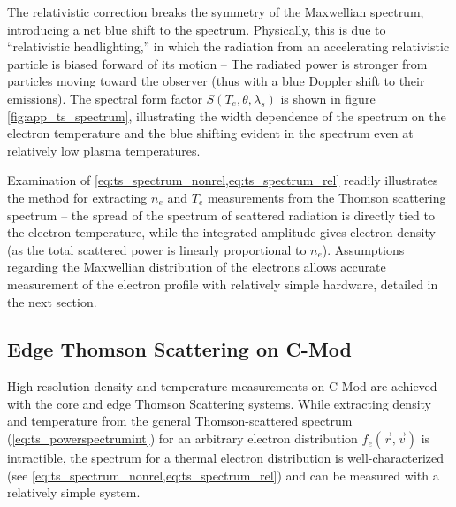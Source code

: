 \noindent The relativistic correction breaks the symmetry of the Maxwellian spectrum, introducing a net blue shift to the spectrum.  Physically, this is due to ``relativistic headlighting,'' in which the radiation from an accelerating relativistic particle is biased forward of its motion -- The radiated power is stronger from particles moving toward the observer (thus with a blue Doppler shift to their emissions).  The spectral form factor $S(T_e,\theta,\lambda_s)$ is shown in figure \cref{fig:app_ts_spectrum}, illustrating the width dependence of the spectrum on the electron temperature and the blue shifting evident in the spectrum even at relatively low plasma temperatures.

Examination of \cref{eq:ts_spectrum_nonrel,eq:ts_spectrum_rel} readily illustrates the method for extracting $n_e$ and $T_e$ measurements from the Thomson scattering spectrum -- the spread of the spectrum of scattered radiation is directly tied to the electron temperature, while the integrated amplitude gives electron density (as the total scattered power is linearly proportional to $n_e$).  Assumptions regarding the Maxwellian distribution of the electrons allows accurate measurement of the electron profile with relatively simple hardware, detailed in the next section.

\subsection{Edge Thomson Scattering on C-Mod}\label{subsec:app_ts_cmod}

High-resolution density and temperature measurements on C-Mod are achieved with the core \cite{Watterson1990,Mossessian1999} and edge \cite{Hughes2001,Hughes2003,Hughes2005} Thomson Scattering systems.  While extracting density and temperature from the general Thomson-scattered spectrum (\cref{eq:ts_powerspectrumint}) for an arbitrary electron distribution $f_e(\vec{r},\vec{v})$ is intractible, the spectrum for a thermal electron distribution is well-characterized (see \cref{eq:ts_spectrum_nonrel,eq:ts_spectrum_rel}) and can be measured with a relatively simple system.


